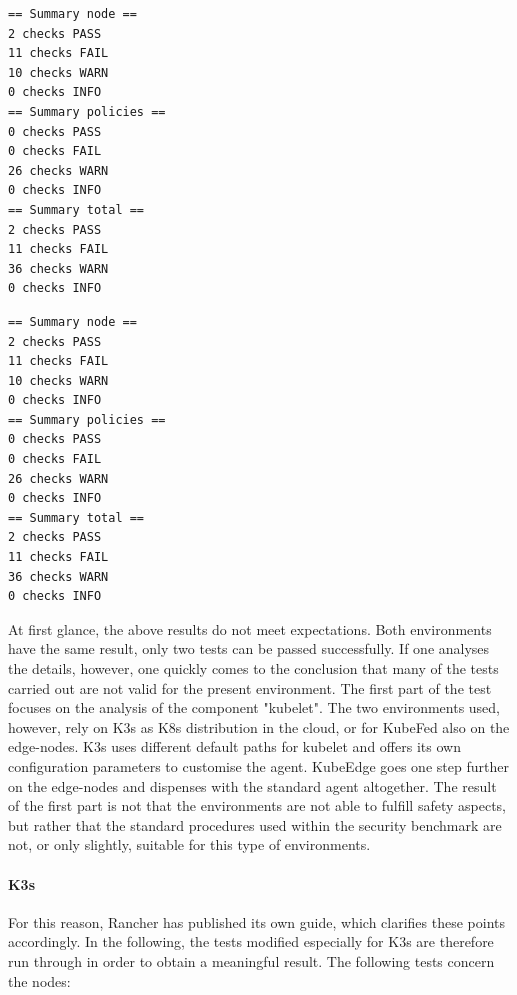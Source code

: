 \documentclass[MSC,Master,english]{twbook}%
\begin{document}
\vspace{\baselineskip}
\begin{center}
\begin{minipage}{.40\linewidth}
    \begin{center}
    \begin{lstlisting}[caption={KubeEdge bench},captionpos=b]
== Summary node ==
2 checks PASS
11 checks FAIL
10 checks WARN
0 checks INFO
== Summary policies ==
0 checks PASS
0 checks FAIL
26 checks WARN
0 checks INFO
== Summary total ==
2 checks PASS
11 checks FAIL
36 checks WARN
0 checks INFO
    \end{lstlisting}
    \end{center}
\end{minipage}
\hspace{.05\linewidth}
\begin{minipage}{.40\linewidth}
    \begin{center}
    \begin{lstlisting}[caption={KubeFed bench},captionpos=b]
== Summary node ==
2 checks PASS
11 checks FAIL
10 checks WARN
0 checks INFO
== Summary policies ==
0 checks PASS
0 checks FAIL
26 checks WARN
0 checks INFO
== Summary total ==
2 checks PASS
11 checks FAIL
36 checks WARN
0 checks INFO
    \end{lstlisting}
    \end{center}
\end{minipage}
\end{center}

At first glance, the above results do not meet expectations. Both environments have the same result, only two tests can be passed successfully. If one analyses the details, however, one quickly comes to the conclusion that many of the tests carried out are not valid for the present environment. The first part of the test focuses on the analysis of the component "kubelet". The two environments used, however, rely on K3s as \ac{K8s} distribution in the cloud, or for KubeFed also on the edge-nodes. K3s uses different default paths for kubelet and offers its own configuration parameters\cite{k3s-config} to customise the agent. KubeEdge goes one step further on the edge-nodes and dispenses with the standard agent altogether. The result of the first part is not that the environments are not able to fulfill safety aspects, but rather that the standard procedures used within the security benchmark are not, or only slightly, suitable for this type of environments. 

\paragraph{K3s} For this reason, Rancher has published its own guide\cite{k3s-assesment}, which clarifies these points accordingly. In the following, the tests modified especially for K3s are therefore run through in order to obtain a meaningful result. The following tests concern the nodes:
\end{document}
